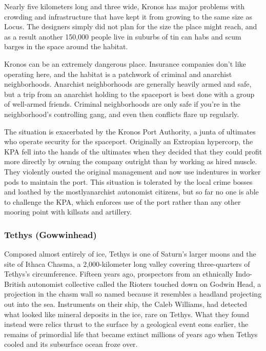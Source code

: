 Nearly five kilometers long and three wide, Kronos has major problems with crowding and infrastructure that have kept it from growing to the same size as Locus. The designers simply did not plan for the size the place might reach, and as a result another 150,000 people live in suburbs of tin can habs and scum barges in the space around the habitat. 

Kronos can be an extremely dangerous place. Insurance companies don't like operating here, and the habitat is a patchwork of criminal and anarchist neighborhoods. Anarchist neighborhoods are generally heavily armed and safe, but a trip from an anarchist holding to the spaceport is best done with a group of well-armed friends. Criminal neighborhoods are only safe if you're in the neighborhood's controlling gang, and even then conflicts flare up regularly. 

The situation is exacerbated by the Kronos Port Authority, a junta of ultimates who operate security for the spaceport. Originally an Extropian hypercorp, the KPA fell into the hands of the ultimates when they decided that they could profit more directly by owning the company outright than by working as hired muscle. They violently ousted the original management and now use indentures in worker pods to maintain the port. This situation is tolerated by the local crime bosses and loathed by the mostlyanarchist autonomist citizens, but so far no one is able to challenge the KPA, which enforces use of the port rather than any other mooring point with killsats and artillery. 

\subsubsection{Tethys (Gowwinhead)}
\label{sec:tethys-gowwinhead} 

Composed almost entirely of ice, Tethys is one of Saturn's larger moons and the site of Ithaca Chasma, a 2,000-kilometer long valley covering three-quarters of Tethys's circumference. Fifteen years ago, prospectors from an ethnically Indo-British autonomist collective called the Rioters touched down on Godwin Head, a projection in the chasm wall so named because it resembles a headland projecting out into the sea. Instruments on their ship, the Caleb Williams, had detected what looked like mineral deposits in the ice, rare on Tethys. What they found instead were relics thrust to the surface by a geological event eons earlier, the remains of primordial life that became extinct millions of years ago when Tethys cooled and its subsurface ocean froze over. 

